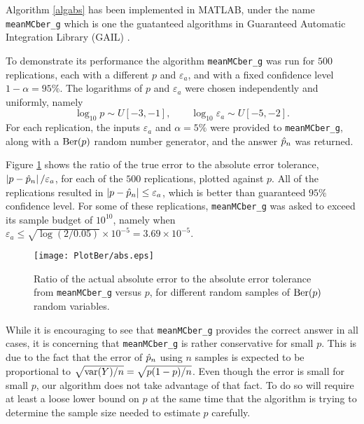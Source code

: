 \documentclass{iitthesis}
\theoremstyle{definition}
\begin{document}
\label{sec:meanMCbergexample}

Algorithm \ref{algabs} has been implemented in MATLAB, under the name {\tt meanMCber\_g} which is one the guatanteed algorithms in Guaranteed Automatic Integration Library (GAIL) \cite{GAIL_2_1}.

To demonstrate its performance the algorithm {\tt meanMCber\_g} was run for $500$ replications, each with a different $p$ and $\varepsilon_a$, and with a fixed confidence level $1-\alpha=95\%$. The logarithms of $p$ and $\varepsilon_a$ were chosen independently and uniformly, namely 
\[
\log_{10} p \sim U[-3,-1], \qquad \log_{10} \varepsilon_a \sim U[-5,-2].
\]
For each replication, the inputs $\varepsilon_a$ and $\alpha=5\%$ were provided to {\tt meanMCber\_g}, along with a $\operatorname{Ber}(p)$ random number generator, and the answer $\hat{p}_n$ was returned.  

Figure \ref{fig:abserrex} shows the ratio of the true error to the absolute error tolerance, $\left \lvert p-\hat{p}_n \right \rvert/\varepsilon_a$, for each of the $500$ replications, plotted against $p$.  All of the replications resulted in $\left \lvert p-\hat{p}_n \right \rvert \le \varepsilon_a$, which is better than guaranteed $95\%$ confidence level.  For some of these replications, {\tt meanMCber\_g} was asked to exceed its sample budget of $10^{10}$, namely when $\varepsilon_a \le \sqrt{\log(2/0.05)} \times 10^{-5} = 3.69 \times 10^{-5}$.

  \begin{figure}[htbp]
    \centering
    \texttt{[image: PlotBer/abs.eps]} %
    \caption{Ratio of the actual absolute error to the absolute error tolerance from {\tt meanMCber\_g} versus $p$, for different random samples of $\operatorname{Ber}(p)$ random variables.}
    \label{fig:abserrex}
 \end{figure}

While it is encouraging to see that {\tt meanMCber\_g} provides the correct answer in all cases, it is concerning that {\tt meanMCber\_g} is rather conservative for small $p$.  This is due to the fact that the error of $\hat{p}_n$ using $n$ samples is expected to be proportional to $\sqrt{\operatorname{var}(Y)/n}=\sqrt{p(1-p)/n}$.  Even though the error is small for small $p$, our algorithm does not take advantage of that fact.  To do so will require at least a loose lower bound on $p$ at the same time that the algorithm is trying to determine the sample size needed to estimate $p$ carefully.
\end{document}
